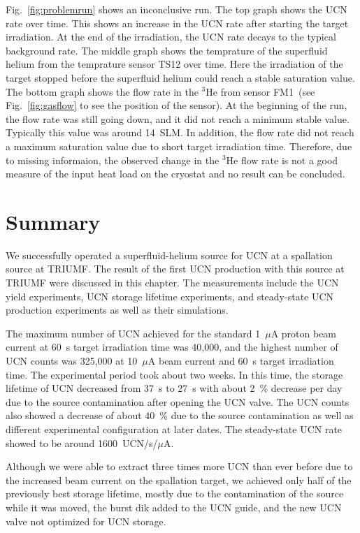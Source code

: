 Fig.~\ref{fig:problemrun} shows an inconclusive run. The top graph
shows the UCN rate over time. This shows an increase in the UCN rate
after starting the target irradiation. At the end of the irradiation,
the UCN rate decays to the typical background rate. The middle graph
shows the temprature of the superfluid helium from the temprature
sensor TS12 over time. Here the irradiation of the target stopped
before the superfluid helium could reach a stable saturation
value. The bottom graph shows the flow rate in the $^3$He from sensor
FM1~(see Fig.~\ref{fig:gasflow} to see the position of the sensor). At
the beginning of the run, the flow rate was still going down, and it
did not reach a minimum stable value. Typically this value was around
14~SLM. In addition, the flow rate did not reach a maximum saturation
value due to short target irradiation time. Therefore, due to missing
informaion, the observed change in the $^3$He flow rate is not a good
measure of the input heat load on the cryostat and no result can be
concluded.


\section{Summary}
We successfully operated a superfluid-helium source for UCN at a
spallation source at TRIUMF. The result of the first UCN production
with this source at TRIUMF were discussed in this
chapter. The measurements include the UCN yield experiments, UCN
storage lifetime experiments, and steady-state UCN production
experiments as well as their simulations.

The maximum number of UCN achieved for the standard 1~$\mu$A proton
beam current at 60~s target irradiation time was 40,000, and the highest
number of UCN counts was 325,000 at 10~$\mu$A beam current and 60~s
target irradiation time. The experimental period took about two
weeks. In this time, the storage lifetime of UCN decreased from 37~s
to 27~s with about 2~\% decrease per day due to the source
contamination after opening the UCN valve. The UCN counts also showed
a decrease of about 40~\% due to the source contamination as well as
different experimental configuration at later dates. The steady-state
UCN rate showed to be around 1600~UCN/s/$\mu$A.

Although we were able to extract three times more UCN than ever before
due to the increased beam current on the spallation target, we
achieved only half of the previously best storage lifetime, mostly due
to the contamination of the source while it was moved, the burst dik
added to the UCN guide, and the new UCN valve not optimized for UCN
storage.

